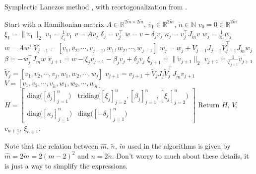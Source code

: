 \begin{algorithm} \caption{Symplectic Lanczos method \cite{SLM}, with reortogonalization from \cite{SLMO}. } \label{alg:symlanz}
\begin{algorithmic}
\STATE Start with a Hamiltonian matrix $A \in \mathbb{R}^{2\tilde{m} \times 2 \tilde{m}}$, $\tilde{v_1} \in \mathbb{R}^{2 \tilde{m}}$, $\tilde{n} \in \mathbb{N}$
\STATE $v_0= 0 \in \mathbb{R}^{2 \tilde{m}}$
\STATE $\xi_1 = \| \tilde{v}_1\|_2$
\STATE $v_1= \frac{1}{\xi_1}  \tilde{v}_1$
	\STATE $v = A v_j$
	\STATE $\delta_j =  v_j^\top$
	\STATE $\tilde{w} = v-\delta_j v_j$
	\STATE $\kappa_j = v_j^\top J_{\tilde{m}} v $
	\STATE $w_j = \frac{1}{\kappa_j} \tilde{w_j}$
	\STATE $w = A w^j$
	\STATE $ \tilde{V}_{j-1} = [v_1,v_2,\cdots,v_{j-1},w_1,w_2,\cdots,w_{j-1}] $
	\STATE $ w_j = w_j + \tilde{V}_{j-1}J_{j-1} \tilde{V}_{j-1}^\top J_{\tilde{m}} w_j $
	\STATE $\beta = -w_j^\top J_{\tilde{m}} w$
	\STATE $\tilde{v}_{j+1} = w - \xi_j v_{j-1} - \beta_j v_j + \delta_j v_j$
	\STATE $ \xi_{j+1} = \|\tilde{v}_{j+1} \|_2 $
	\STATE $ v_{j+1} = \frac{1}{\xi_{j+1}} \tilde{v}_{j+1} $
	\STATE $ \tilde{V}_j = [v_1,v_2,\cdots,v_{j},w_1,w_2,\cdots,w_{j}] $
	\STATE $ v_{j+1} = v_{j+1} + \tilde{V}_j J_j \tilde{V}_j^\top J_{\tilde{m}} v_{j+1} $
\ENDFOR
\STATE $V = [v_1,v_2,\cdots,v_{\tilde{n}},w_1,w_2,\cdots,w_{\tilde{n}}]$
\STATE $H = \begin{bmatrix}
\text{diag} \big( [\delta_j]^n_{j=1} \big) & \text{tridiag}\big( [\xi_j]_{j=2}^n,[\beta_j]_{j=1}^n,[\xi_j]_{j=2}^n \big) \\
\text{diag} \big( [\kappa_j]^n_{j=1} \big) & \text{diag} \big( [-\delta_j]^n_{j=1} \big)
\end{bmatrix} $
\STATE Return $H$, $V$, $v_{n+1}$, $\xi_{n+1}$.
\end{algorithmic}
\end{algorithm}
Note that the relation between $\hat{m}$, $\tilde{n}$, $\tilde{m}$ used in the algorithms is given by $\hat{m} = 2\tilde{m}= 2(m-2)^2$ and $ n = 2\tilde{n}$. Don't worry to much about these details, it is just a way to simplify the expressions.

